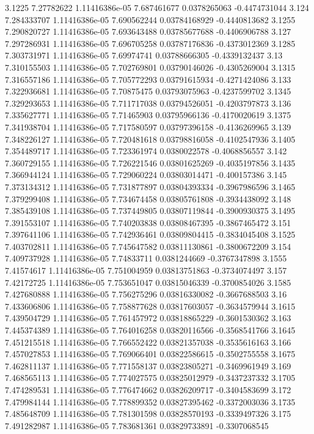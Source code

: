 {3.1225 7.27782622 1.11416386e-05 7.687461677 0.0378265063 -0.4474731044
3.124 7.284333707 1.11416386e-05 7.690562244 0.03784168929 -0.4440813682
3.1255 7.290820727 1.11416386e-05 7.693643488 0.03785677688 -0.4406906788
3.127 7.297286931 1.11416386e-05 7.696705258 0.03787176836 -0.4373012369
3.1285 7.303731971 1.11416386e-05 7.69974741 0.03788666305 -0.4339132437
3.13 7.310155503 1.11416386e-05 7.702769801 0.03790146026 -0.4305269004
3.1315 7.316557186 1.11416386e-05 7.705772293 0.03791615934 -0.4271424086
3.133 7.322936681 1.11416386e-05 7.70875475 0.03793075963 -0.4237599702
3.1345 7.329293653 1.11416386e-05 7.711717038 0.03794526051 -0.4203797873
3.136 7.335627771 1.11416386e-05 7.71465903 0.03795966136 -0.4170020619
3.1375 7.341938704 1.11416386e-05 7.717580597 0.03797396158 -0.4136269965
3.139 7.348226127 1.11416386e-05 7.720481618 0.03798816058 -0.4102547936
3.1405 7.354489717 1.11416386e-05 7.723361974 0.0380022578 -0.4068856557
3.142 7.360729155 1.11416386e-05 7.726221546 0.03801625269 -0.4035197856
3.1435 7.366944124 1.11416386e-05 7.729060224 0.03803014471 -0.400157386
3.145 7.373134312 1.11416386e-05 7.731877897 0.03804393334 -0.3967986596
3.1465 7.379299408 1.11416386e-05 7.734674458 0.03805761808 -0.3934438092
3.148 7.385439108 1.11416386e-05 7.737449805 0.03807119844 -0.3900930375
3.1495 7.391553107 1.11416386e-05 7.740203838 0.03808467395 -0.3867465472
3.151 7.397641106 1.11416386e-05 7.742936461 0.03809804415 -0.3834045408
3.1525 7.403702811 1.11416386e-05 7.745647582 0.03811130861 -0.3800672209
3.154 7.409737928 1.11416386e-05 7.74833711 0.0381244669 -0.3767347898
3.1555 7.41574617 1.11416386e-05 7.751004959 0.03813751863 -0.3734074497
3.157 7.42172725 1.11416386e-05 7.753651047 0.03815046339 -0.3700854026
3.1585 7.427680888 1.11416386e-05 7.756275296 0.03816330082 -0.3667688503
3.16 7.433606806 1.11416386e-05 7.758877628 0.03817603057 -0.3634579944
3.1615 7.439504729 1.11416386e-05 7.761457972 0.03818865229 -0.3601530362
3.163 7.445374389 1.11416386e-05 7.764016258 0.03820116566 -0.3568541766
3.1645 7.451215518 1.11416386e-05 7.766552422 0.03821357038 -0.3535616163
3.166 7.457027853 1.11416386e-05 7.769066401 0.03822586615 -0.3502755558
3.1675 7.462811137 1.11416386e-05 7.771558137 0.03823805271 -0.3469961949
3.169 7.468565113 1.11416386e-05 7.774027575 0.03825012979 -0.3437237332
3.1705 7.474289531 1.11416386e-05 7.776474662 0.03826209717 -0.3404583699
3.172 7.479984144 1.11416386e-05 7.778899352 0.03827395462 -0.3372003036
3.1735 7.485648709 1.11416386e-05 7.781301598 0.03828570193 -0.3339497326
3.175 7.491282987 1.11416386e-05 7.783681361 0.03829733891 -0.3307068545
}
